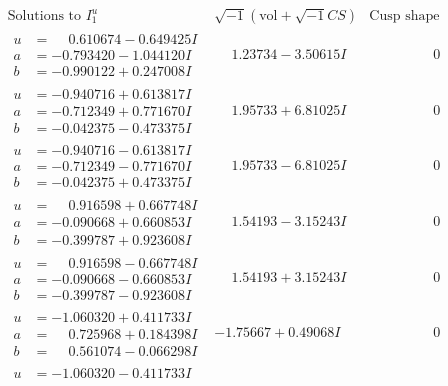 \documentclass[1p]{elsarticle_modified}
\theoremstyle{definition}
\newcommand{\I}{\sqrt{-1}}
\begin{document}
$$\begin{array}{c|c|c}
\text{Solutions to }I^u_{1}& \I (\text{vol} + \sqrt{-1}CS) & \text{Cusp shape}\\
 \hline 
\begin{aligned}
u &= \phantom{-}0.610674 - 0.649425 I \\
a &= -0.793420 - 1.044120 I \\
b &= -0.990122 + 0.247008 I\end{aligned}
 & \phantom{-}1.23734 - 3.50615 I & \phantom{-0.000000 } 0 \\ \hline\begin{aligned}
u &= -0.940716 + 0.613817 I \\
a &= -0.712349 + 0.771670 I \\
b &= -0.042375 - 0.473375 I\end{aligned}
 & \phantom{-}1.95733 + 6.81025 I & \phantom{-0.000000 } 0 \\ \hline\begin{aligned}
u &= -0.940716 - 0.613817 I \\
a &= -0.712349 - 0.771670 I \\
b &= -0.042375 + 0.473375 I\end{aligned}
 & \phantom{-}1.95733 - 6.81025 I & \phantom{-0.000000 } 0 \\ \hline\begin{aligned}
u &= \phantom{-}0.916598 + 0.667748 I \\
a &= -0.090668 + 0.660853 I \\
b &= -0.399787 + 0.923608 I\end{aligned}
 & \phantom{-}1.54193 - 3.15243 I & \phantom{-0.000000 } 0 \\ \hline\begin{aligned}
u &= \phantom{-}0.916598 - 0.667748 I \\
a &= -0.090668 - 0.660853 I \\
b &= -0.399787 - 0.923608 I\end{aligned}
 & \phantom{-}1.54193 + 3.15243 I & \phantom{-0.000000 } 0 \\ \hline\begin{aligned}
u &= -1.060320 + 0.411733 I \\
a &= \phantom{-}0.725968 + 0.184398 I \\
b &= \phantom{-}0.561074 - 0.066298 I\end{aligned}
 & -1.75667 + 0.49068 I & \phantom{-0.000000 } 0 \\ \hline\begin{aligned}
u &= -1.060320 - 0.411733 I \\

\end{aligned}
\end{array}$$
\end{document}
